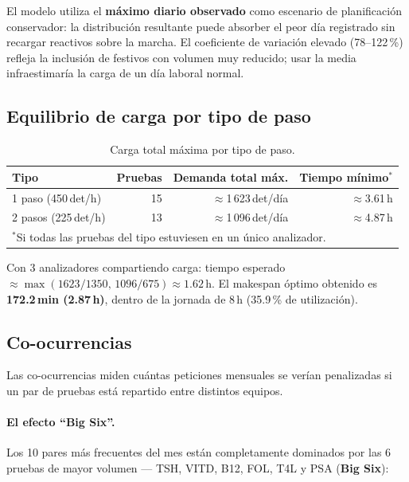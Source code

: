 \documentclass[12pt, a4paper]{article}
\begin{document}
El modelo utiliza el \textbf{máximo diario observado} como escenario de planificación
conservador: la distribución resultante puede absorber el peor día registrado sin recargar
reactivos sobre la marcha. El coeficiente de variación elevado (78--122\,\%) refleja la
inclusión de festivos con volumen muy reducido; usar la media infraestimaría la carga
de un día laboral normal.

\subsection{Equilibrio de carga por tipo de paso}

\begin{table}[H]
\centering
\caption{Carga total máxima por tipo de paso.}
\begin{tabular}{lrrr}
\toprule
\textbf{Tipo} & \textbf{Pruebas} & \textbf{Demanda total máx.} & \textbf{Tiempo mínimo$^*$} \\
\midrule
1 paso (450\,det/h) & 15 & $\approx$1\,623\,det/día & $\approx$3.61\,h \\
2 pasos (225\,det/h) & 13 & $\approx$1\,096\,det/día & $\approx$4.87\,h \\
\bottomrule
\multicolumn{4}{l}{$^*$Si todas las pruebas del tipo estuviesen en un único analizador.}
\end{tabular}
\end{table}

Con 3 analizadores compartiendo carga: tiempo esperado $\approx \max(1623/1350,\,1096/675) \approx 1.62$\,h.
El makespan óptimo obtenido es \textbf{172.2\,min (2.87\,h)}, dentro de la jornada de 8\,h
(35.9\,\% de utilización).

\subsection{Co-ocurrencias}

Las co-ocurrencias miden cuántas peticiones mensuales se verían penalizadas si un par de
pruebas está repartido entre distintos equipos.

\paragraph{El efecto ``Big Six''.}
Los 10 pares más frecuentes del mes están completamente dominados por las 6 pruebas de
mayor volumen --- TSH, VITD, B12, FOL, T4L y PSA (\textbf{Big Six}):
\end{document}
